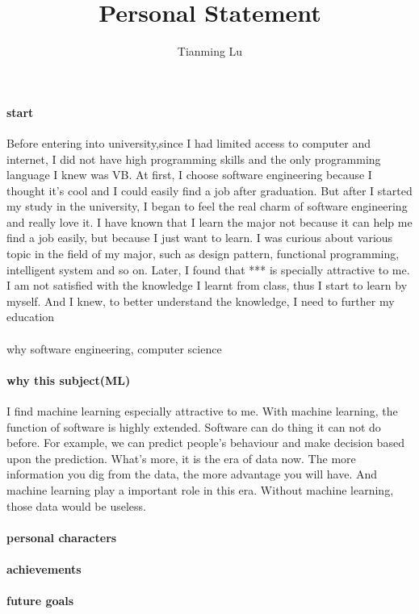 \documentclass{article}
\title{Personal Statement}
\author{Tianming Lu}
\begin{document}
\maketitle
\paragraph{start}
Before entering into university,since I had limited access to computer and internet, I did not have high programming skills and the only programming language I knew was VB. At first, I choose software engineering because I thought it's cool and I could easily find a job after graduation. But after I started my study in the university, I began to feel the real charm of software engineering and really love it. I have known that I learn the major not because it can help me find a job easily, but because I just want to learn. I was curious about various topic in the field of my major, such as design pattern, functional programming, intelligent system and so on.
Later, I found that *** is specially attractive to me. I am not satisfied with the knowledge I learnt from class, thus I start to learn by myself. And I knew, to better understand the knowledge, I need to further my education 
\paragraph{}
why software engineering, computer science
\paragraph{why this subject(ML)}
I find machine learning especially attractive to me. With machine learning, the function of software is highly extended. Software can do thing it can not do before. For example, we can predict people's behaviour and make decision based upon the prediction. What's more, it is the era of data now. The more information you dig from the data, the more advantage you will have. And machine learning play a important role in this era. Without machine learning, those data would be useless. 
\paragraph{personal characters}

\paragraph{achievements}
\paragraph{future goals} 
\end{document}
